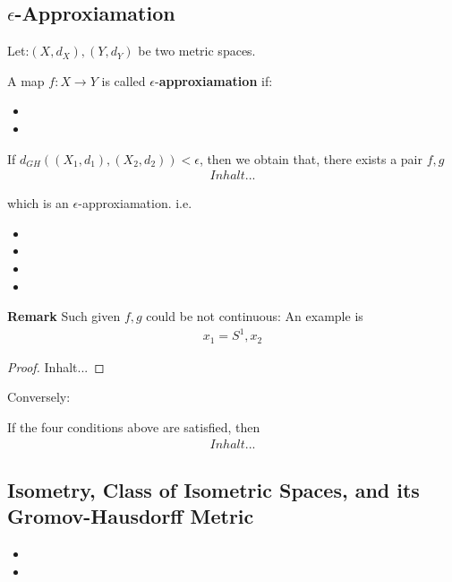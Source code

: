 \documentclass[Total.tex]{subfiles}
\begin{document}
		\subsection{$\epsilon$-Approxiamation}
			\begin{Def}
				Let:$(X,d_X),(Y,d_Y)$ be two metric spaces. 
				
				A map $f:X\rightarrow Y$ is called $\epsilon$-\textbf{approxiamation} if:
				\begin{itemize}
					\item 
					\item
				\end{itemize}
			\end{Def}
			
			\begin{theorem}
				If $d_{GH}((X_1,d_1),(X_2,d_2))<\epsilon$, then we obtain that, there exists a pair $f,g$
				\begin{gather*}
					Inhalt...
				\end{gather*}
				
				which is an $\epsilon$-approxiamation. i.e. 
				\begin{itemize}
					\item 
					\item 
					\item 
					\item 
				\end{itemize}
			\end{theorem}
			\textbf{Remark} Such given $f,g$ could be not continuous: An example is
			\begin{gather*}
				x_1=S^1,x_2
			\end{gather*}
			\begin{proof}
				Inhalt...
			\end{proof}
			
			Conversely:
			\begin{proposition}
				If the four conditions above are satisfied, then
				\begin{gather*}
					Inhalt...
				\end{gather*}
			\end{proposition}
			
			\subsection{Isometry, Class of Isometric Spaces, and its Gromov-Hausdorff Metric}
				\begin{Def}
					\begin{itemize}
						\item 
						\item 
					\end{itemize}
				\end{Def}
				
\end{document}
